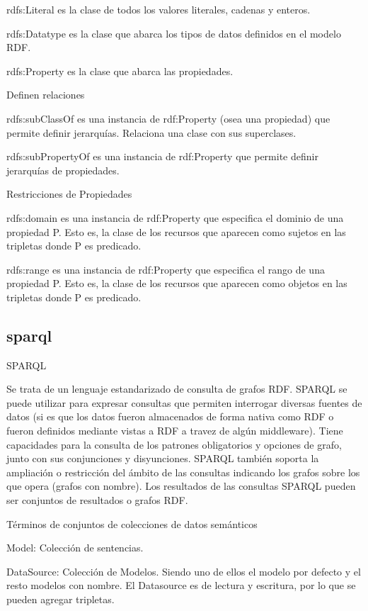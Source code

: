     rdfs:Literal es la clase de todos los valores literales, cadenas y enteros.

    rdfs:Datatype es la clase que abarca los tipos de datos definidos en el modelo RDF.

    rdfs:Property es la clase que abarca las propiedades.

Definen relaciones

    rdfs:subClassOf es una instancia de rdf:Property (osea una propiedad) que permite definir jerarquías. Relaciona una clase con sus superclases.

    rdfs:subPropertyOf es una instancia de rdf:Property que permite definir jerarquías de propiedades.
    
Restricciones de Propiedades

    rdfs:domain es una instancia de rdf:Property que especifica el dominio de una propiedad P. Esto es, la clase de los recursos que aparecen como sujetos en las tripletas donde P es predicado.

    rdfs:range es una instancia de rdf:Property que especifica el rango de una propiedad P. Esto es, la clase de los recursos que aparecen como objetos en las tripletas donde P es predicado.
    
\subsection{sparql}
SPARQL

Se trata de un lenguaje estandarizado de consulta de grafos RDF.
SPARQL se puede utilizar para expresar consultas que permiten interrogar diversas fuentes de datos (si es que los datos fueron almacenados 
de forma nativa como RDF o fueron definidos mediante vistas a RDF a travez de algún middleware). Tiene capacidades para la consulta
de los patrones obligatorios y opciones de grafo, junto con sus conjunciones y disyunciones. SPARQL también soporta 
la ampliación o restricción del ámbito de las consultas indicando los grafos sobre los que opera (grafos con nombre). Los resultados de las consultas
SPARQL pueden ser conjuntos de resultados o grafos RDF.


Términos de conjuntos de colecciones de datos semánticos

Model: Colección de sentencias.

DataSource: Colección de Modelos. Siendo uno de ellos el modelo por defecto y el resto modelos con nombre. El Datasource es de lectura y escritura, por lo que se pueden agregar tripletas.

